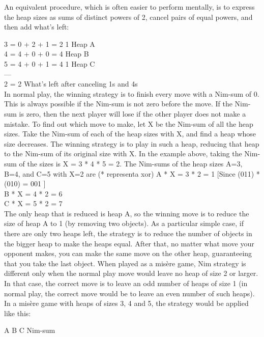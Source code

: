 \documentclass[10pt,letterpaper,twocolumn,twosided]{article}
\begin{document}
An equivalent procedure, which is often easier to perform mentally, is to express the heap sizes as sums of distinct powers of 2, cancel pairs of equal powers, and then add what's left:

3 = 0 + 2 + 1 =     2   1      Heap A\\
4 = 4 + 0 + 0 = 4              Heap B\\
5 = 4 + 0 + 1 = 4       1      Heap C\\
---\\
2 =                 2          What's left after canceling 1s and 4s\\

In normal play, the winning strategy is to finish every move with a Nim-sum of 0. This is always possible if the Nim-sum is not zero before the move. If the Nim-sum is zero, then the next player will lose if the other player does not make a mistake. To find out which move to make, let X be the Nim-sum of all the heap sizes. Take the Nim-sum of each of the heap sizes with X, and find a heap whose size decreases. The winning strategy is to play in such a heap, reducing that heap to the Nim-sum of its original size with X. In the example above, taking the Nim-sum of the sizes is X = 3 * 4 * 5 = 2. The Nim-sums of the heap sizes A=3, B=4, and C=5 with X=2 are
(* representa xor)
A * X = 3 * 2 = 1 [Since (011) * (010) = 001 ]\\
B * X = 4 * 2 = 6\\
C * X = 5 * 2 = 7\\
The only heap that is reduced is heap A, so the winning move is to reduce the size of heap A to 1 (by removing two objects).
As a particular simple case, if there are only two heaps left, the strategy is to reduce the number of objects in the bigger heap to make the heaps equal. After that, no matter what move your opponent makes, you can make the same move on the other heap, guaranteeing that you take the last object.
When played as a misère game, Nim strategy is different only when the normal play move would leave no heap of size 2 or larger. In that case, the correct move is to leave an odd number of heaps of size 1 (in normal play, the correct move would be to leave an even number of such heaps).
In a misère game with heaps of sizes 3, 4 and 5, the strategy would be applied like this:

A B C Nim-sum\\
 
\end{document}
